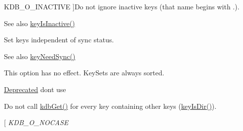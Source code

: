 \begin{Desc}
\begin{description}
{\hypertarget{group__kdb_gga98a3d6a4016c9dad9cbd1a99a9c2a45aa789926d8a8e15b029cf7dded4154bcda}{
KDB\_\-O\_\-INACTIVE}
\label{group__kdb_gga98a3d6a4016c9dad9cbd1a99a9c2a45aa789926d8a8e15b029cf7dded4154bcda}
}]Do not ignore inactive keys (that name begins with .). \begin{DoxySeeAlso}{See also}
\hyperlink{group__keytest_gaa25f699f592031c1a0abc1504d14e13e}{keyIsInactive()} 
\end{DoxySeeAlso}
\item[{\em 
\hypertarget{group__kdb_gga98a3d6a4016c9dad9cbd1a99a9c2a45aaa7d5265eacbb1590982b718f35443e2e}{
KDB\_\-O\_\-SYNC}
\label{group__kdb_gga98a3d6a4016c9dad9cbd1a99a9c2a45aaa7d5265eacbb1590982b718f35443e2e}
}]Set keys independent of sync status. \begin{DoxySeeAlso}{See also}
\hyperlink{group__keytest_gaf247df0de7aca04b32ef80e39ef12950}{keyNeedSync()} 
\end{DoxySeeAlso}
\item[{\em 
\hypertarget{group__kdb_gga98a3d6a4016c9dad9cbd1a99a9c2a45aad9d03b36ee88ca5a774cc01b190c99b8}{
KDB\_\-O\_\-SORT}
\label{group__kdb_gga98a3d6a4016c9dad9cbd1a99a9c2a45aad9d03b36ee88ca5a774cc01b190c99b8}
}]This option has no effect. KeySets are always sorted. \begin{Desc}
\item[\hyperlink{deprecated__deprecated000001}{Deprecated}]dont use \end{Desc}
\item[{\em 
\hypertarget{group__kdb_gga98a3d6a4016c9dad9cbd1a99a9c2a45aa6adaa17b267027ce50e670bf8cc6e824}{
KDB\_\-O\_\-NORECURSIVE}
\label{group__kdb_gga98a3d6a4016c9dad9cbd1a99a9c2a45aa6adaa17b267027ce50e670bf8cc6e824}
}]Do not call \hyperlink{group__kdb_ga28e385fd9cb7ccfe0b2f1ed2f62453a1}{kdbGet()} for every key containing other keys (\hyperlink{group__keytest_gac0a10c602d52a35f81347e8a32312017}{keyIsDir()}). \item[{\em 
\hypertarget{group__kdb_gga98a3d6a4016c9dad9cbd1a99a9c2a45aaa5586d229e048f816bf7982765442b86}{
KDB\_\-O\_\-NOCASE}
\label{group__kdb_gga98a3d6a4016c9dad9cbd1a99a9c2a45aaa5586d229e048f816bf7982765442b86}
}
\end{description}
\end{Desc}
